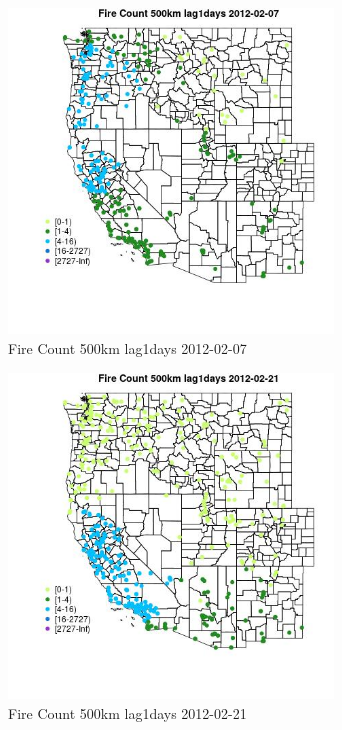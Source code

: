 \begin{figure} 
\centering  
\includegraphics[width=0.77\textwidth]{Code_Outputs/Report_ML_input_PM25_Step4_part_f_de_duplicated_aveswNAs_MapObsFire_Count_500km_lag1days2012-02-07.jpg} 
\caption{\label{fig:Report_ML_input_PM25_Step4_part_f_de_duplicated_aveswNAsMapObsFire_Count_500km_lag1days2012-02-07}Fire Count 500km lag1days 2012-02-07} 
\end{figure} 
 

\clearpage 

\begin{figure} 
\centering  
\includegraphics[width=0.77\textwidth]{Code_Outputs/Report_ML_input_PM25_Step4_part_f_de_duplicated_aveswNAs_MapObsFire_Count_500km_lag1days2012-02-21.jpg} 
\caption{\label{fig:Report_ML_input_PM25_Step4_part_f_de_duplicated_aveswNAsMapObsFire_Count_500km_lag1days2012-02-21}Fire Count 500km lag1days 2012-02-21} 
\end{figure} 
 

